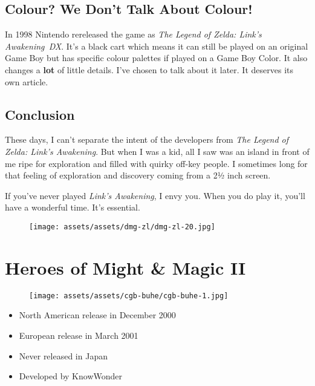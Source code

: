 \documentclass{book}
\begin{document}
\FloatBarrier\needspace{10mm}\section*{Colour? We Don’t Talk About Colour!}\nopagebreak[4]

In 1998 Nintendo rereleased the game as \emph{The Legend of Zelda: Link’s Awakening~DX}. It’s a black cart which means it can still be played on an original Game Boy but has specific colour palettes if played on a Game Boy Color. It also changes a \textbf{lot} of little details. I’ve chosen to talk about it later. It deserves its own article.

\FloatBarrier\needspace{10mm}\section*{Conclusion}\nopagebreak[4]

These days, I can’t separate the intent of the developers from \emph{The Legend of Zelda: Link’s Awakening}. But when I was a kid, all I saw was an island in front of me ripe for exploration and filled with quirky off-key people. I sometimes long for that feeling of exploration and discovery coming from a 2½ inch screen.

If you’ve never played \emph{Link’s Awakening}, I envy you. When you do play it, you’ll have a wonderful time. It’s essential.

\begin{figure}[hbt]
\vskip 10pt
\centering \texttt{[image: assets/assets/dmg-zl/dmg-zl-20.jpg]}
\vskip 6pt
\end{figure}



\begingroup \chapter*{Heroes of Might \& Magic II} \endgroup
\begin{figure}[H]
\vskip 4pt
\centering
\texttt{[image: assets/assets/cgb-buhe/cgb-buhe-1.jpg]}\end{figure}
\begin{itemize} [nosep]




\item North American release in December 2000







\item European release in March 2001








\item Never released in Japan





\item Developed by KnowWonder

\end{itemize}\noindent
\end{document}

